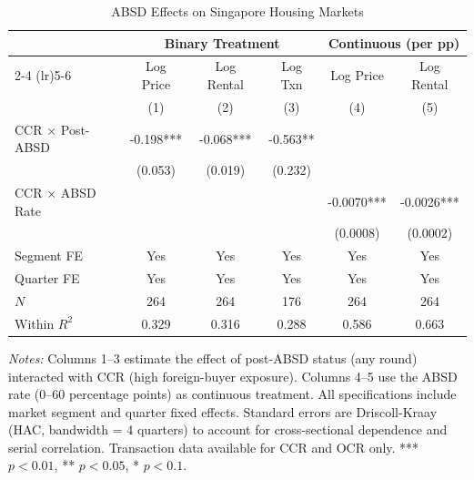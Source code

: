 \begin{table}[htbp]
\centering
\caption{ABSD Effects on Singapore Housing Markets}\label{tab:main}
\begin{threeparttable}
\begin{tabular}{lccccc}
\toprule
 & \multicolumn{3}{c}{Binary Treatment} & \multicolumn{2}{c}{Continuous (per pp)} \\
\cmidrule(lr){2-4} \cmidrule(lr){5-6}
 & Log Price & Log Rental & Log Txn & Log Price & Log Rental \\
 & (1) & (2) & (3) & (4) & (5) \\
\midrule
CCR $\times$ Post-ABSD & -0.198*** & -0.068*** & -0.563** & & \\
 & (0.053) & (0.019) & (0.232) & & \\
CCR $\times$ ABSD Rate & & & & -0.0070*** & -0.0026*** \\
 & & & & (0.0008) & (0.0002) \\
\midrule
Segment FE & Yes & Yes & Yes & Yes & Yes \\
Quarter FE & Yes & Yes & Yes & Yes & Yes \\
$N$ & 264 & 264 & 176 & 264 & 264 \\
Within $R^2$ & 0.329 & 0.316 & 0.288 & 0.586 & 0.663 \\
\bottomrule
\end{tabular}
\begin{tablenotes}[flushleft]\small
\item \textit{Notes:} Columns 1--3 estimate the effect of post-ABSD status (any round) interacted with CCR (high foreign-buyer exposure). Columns 4--5 use the ABSD rate (0--60 percentage points) as continuous treatment. All specifications include market segment and quarter fixed effects. Standard errors are Driscoll-Kraay (HAC, bandwidth = 4 quarters) to account for cross-sectional dependence and serial correlation. Transaction data available for CCR and OCR only. *** $p<0.01$, ** $p<0.05$, * $p<0.1$.
\end{tablenotes}
\end{threeparttable}
\end{table}

